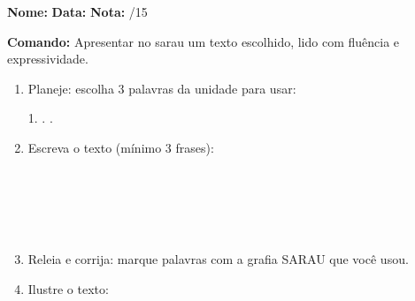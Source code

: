 

\begin{exercicio}

\noindent\textbf{Nome:} \underline{\hspace{3.2cm}} \quad \textbf{Data:} \underline{\hspace{1.6cm}} \quad \textbf{Nota:} \underline{\hspace{0.9cm}}/15


\noindent\textbf{Comando:} Apresentar no sarau um texto escolhido, lido com fluência e expressividade.


\begin{enumerate}

  \item Planeje: escolha 3 palavras da unidade para usar:
  \begin{center}
  1. \underline{\hspace{3cm}} . \underline{\hspace{3cm}} . \underline{\hspace{3cm}}
  \end{center}

  \item Escreva o texto (mínimo 3 frases):
  \begin{center}
  \underline{\hspace{12cm}}\\\underline{\hspace{12cm}}\\\underline{\hspace{12cm}}\\\underline{\hspace{12cm}}\\\underline{\hspace{12cm}}
  \end{center}

  \item Releia e corrija: marque palavras com a grafia SARAU que você usou.

  \item Ilustre o texto:
  \begin{center}
  \end{center}

\end{enumerate}

\end{exercicio}

